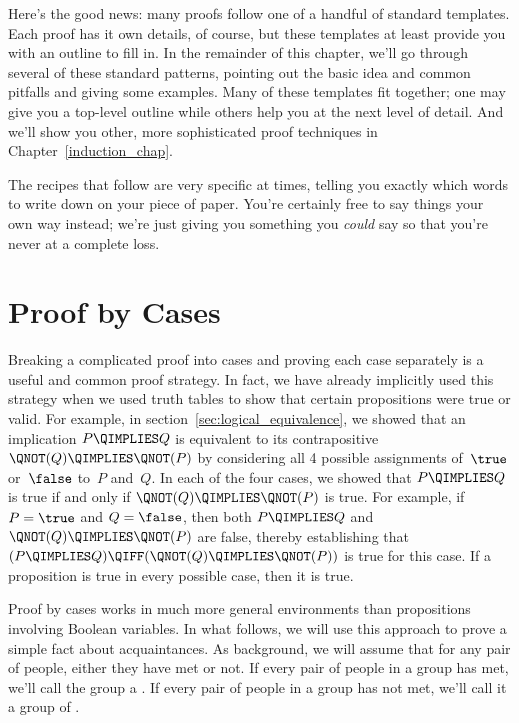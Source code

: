 Here's the good news: many proofs follow one of a handful of standard
templates.  Each proof has it own details, of course, but these
templates at least provide you with an outline to fill in.  In the
remainder of this chapter, we'll go
through several of these standard patterns, pointing out the basic
idea and common pitfalls and giving some examples.  Many of these
templates fit together; one may give you a top-level outline while
others help you at the next level of detail.  And we'll show you
other, more sophisticated proof techniques in
Chapter~\ref{induction_chap}.

The recipes that follow are very specific at times, telling you exactly
which words to write down on your piece of paper.  You're certainly
free to say things your own way instead; we're just giving you
something you \emph{could} say so that you're never at a complete
loss.

\section{Proof by Cases}

Breaking a complicated proof into cases and proving each case
separately is a useful and common proof strategy.  In fact, we have
already implicitly used this strategy when we used truth tables to
show that certain propositions were true or valid.  For example, in
section~\ref{sec:logical_equivalence}, we showed that an implication
$P \QIMPLIES Q$ is equivalent to its contrapositive $\QNOT(Q)
\QIMPLIES \QNOT(P)$ by considering all 4 possible assignments
of~$\true$ or~$\false$ to~$P$ and~$Q$.  In each of the four cases, we
showed that $P \QIMPLIES Q$ is true if and only if $\QNOT(Q) \QIMPLIES
\QNOT(P)$ is true.  For example, if $P = \true$ and $Q = \false$, then
both $P \QIMPLIES Q$ and $\QNOT(Q) \QIMPLIES \QNOT(P)$ are false,
thereby establishing that $(P \QIMPLIES Q) \QIFF (\QNOT(Q) \QIMPLIES
\QNOT(P))$ is true for this case.  If a proposition is true in every
possible case, then it is true.

Proof by cases works in much more general environments than
propositions involving Boolean variables.  In what follows, we will
use this approach to prove a simple fact about acquaintances.  As
background, we will assume that for any pair of people, either they
have met or not.  If every pair of people in a group has met, we'll
call the group a .  If every pair of people in a group has
not met, we'll call it a group of .

